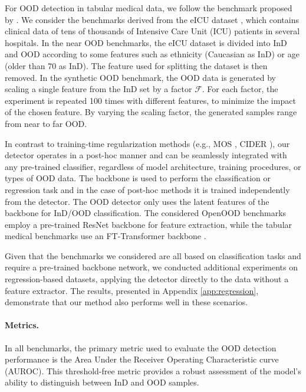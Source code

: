 For OOD detection in tabular medical data, we follow the benchmark proposed by \citet{azizmalayeri2023unmasking}. 
We consider the benchmarks derived from the eICU dataset \citep{Pollard2018}, which contains clinical data of tens of thousands of Intensive Care Unit (ICU) patients in several hospitals.
In the near OOD benchmarks, the eICU dataset is divided into InD and OOD according to some features such as ethnicity (Caucasian as InD) or age (older than 70 as InD). 
The feature used for splitting the dataset is then removed.
In the synthetic OOD benchmark, the OOD data is generated by scaling a single feature from the InD set by a factor $\mathcal{F}$. 
For each factor, the experiment is repeated 100 times with different features, to minimize the impact of the chosen feature. 
By varying the scaling factor, the generated samples range from near to far OOD.

In contrast to training-time regularization methods (e.g., MOS \citep{huang2021mos}, CIDER \citep{ming2023how}), our detector operates in a post-hoc manner and can be seamlessly integrated with any pre-trained classifier, regardless of model architecture, training procedures, or types of OOD data.
The backbone is used to perform the classification or regression task and in the case of post-hoc methods it is trained independently from the detector.
The OOD detector only uses the latent features of the backbone for InD/OOD classification.
The considered OpenOOD benchmarks employ a pre-trained ResNet backbone \citep{he2015deepresiduallearningimage} for feature extraction, while the tabular medical benchmarks use an FT-Transformer backbone \citep{gorishniy2021revisiting}.

Given that the benchmarks we considered are all based on classification tasks and require a pre-trained backbone network, we conducted additional experiments on regression-based datasets, applying the detector directly to the data without a feature extractor. The results, presented in Appendix \ref{app:regression}, demonstrate that our method also performs well in these scenarios.

\paragraph{Metrics.} 
In all benchmarks, the primary metric used to evaluate the OOD detection performance is the Area Under the Receiver Operating Characteristic curve (AUROC). 
This threshold-free metric provides a robust assessment of the model's ability to distinguish between InD and OOD samples. 

